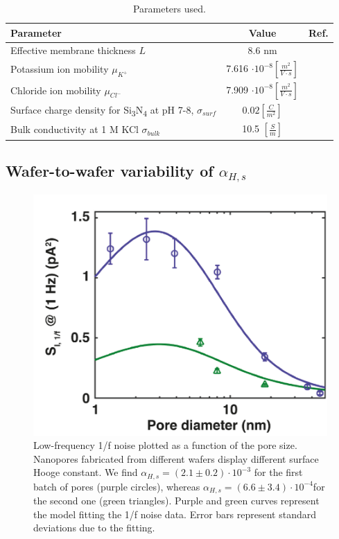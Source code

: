 \begin{table}[h]
	\begin{tabular}{|l|c|c|}
		\hline
			Parameter & Value & Ref.\\
			\hline
			Effective membrane thickness $L$ & $8.6$ nm &\cite{Kowalczyk2011b}  \\
			Potassium ion mobility $\mu_{K^+}$  & 7.616 $\cdot 10^{-8} \left[\frac{m^2}{ V\cdot s}\right]$ & \cite{Lide2005}  \\
			Chloride ion mobility $\mu_{Cl^-}$  & 7.909 $\cdot 10^{-8} \left[\frac{m^2}{ V\cdot s}\right]$ &\cite{Lide2005}   \\
			Surface charge density for Si\textsubscript{3}N\textsubscript{4} at pH 7-8, $\sigma_{surf} $ &  $0.02 \left[\frac{C}{m^2}\right]$&\cite{Sonnefeld1996}   \\
			Bulk conductivity at 1 M KCl $\sigma_{bulk}$ & 10.5 $\left[\frac{S}{m}\right]$ & \cite{Haynes2010}\\
		\hline
	\end{tabular}
\caption{\label{tab:table2.2}Parameters used.}
\end{table}



\subsection{Wafer-to-wafer variability of $\alpha_{H,s}$}\label{sec:S2.4.4}

\begin{figure}[H]
	\centering
	\includegraphics[width=0.7\linewidth]{figures/Figure2.6.png}
	\caption{Low-frequency 1/f noise plotted as a function of the pore size. Nanopores fabricated from different wafers display different surface Hooge constant. We find $\alpha_{H,s}=(2.1\pm 0.2)\cdot 10^{-3}$ for the first batch of pores (purple circles), whereas $\alpha_{H,s}=(6.6\pm 3.4)\cdot 10^{-4} $for the second one (green triangles). Purple and green curves represent the model fitting the 1/f noise data. Error bars represent standard deviations due to the fitting.}
	\label{fig:fig.2.6}
\end{figure}



